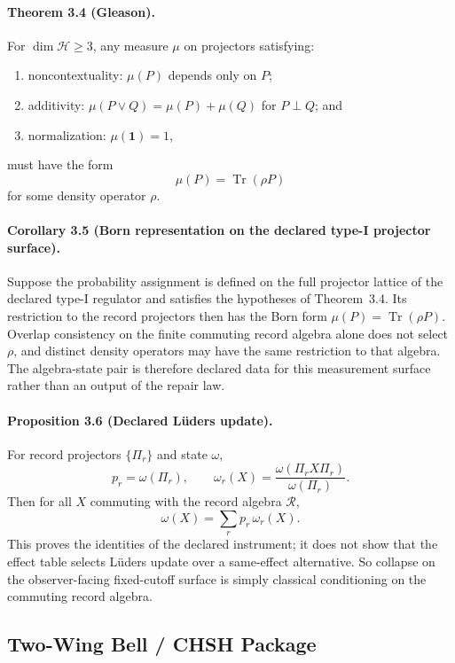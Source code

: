 \paragraph{\textbf{Theorem 3.4 (Gleason).}}
For \(\dim \mathcal H\ge 3\), any measure \(\mu\) on projectors satisfying:
\begin{enumerate}[leftmargin=2em]
\item noncontextuality: \(\mu(P)\) depends only on \(P\);
\item additivity: \(\mu(P\vee Q)=\mu(P)+\mu(Q)\) for \(P\perp Q\); and
\item normalization: \(\mu(\mathbf 1)=1\),
\end{enumerate}
must have the form
\[
\mu(P)=\operatorname{Tr}(\rho P)
\]
for some density operator \(\rho\).

\paragraph{\textbf{Corollary 3.5 (Born representation on the declared type-I projector surface).}}
Suppose the probability assignment is defined on the full projector lattice of the declared
type-I regulator and satisfies the hypotheses of Theorem~3.4. Its restriction to the record
projectors then has the Born form \(\mu(P)=\operatorname{Tr}(\rho P)\). Overlap consistency on the
finite commuting record algebra alone does not select \(\rho\), and distinct density operators may
have the same restriction to that algebra. The algebra-state pair is therefore declared data for
this measurement surface rather than an output of the repair law.

\paragraph{\textbf{Proposition 3.6 (Declared L\"uders update).}}
For record projectors \(\{\Pi_r\}\) and state \(\omega\),
\[
p_r=\omega(\Pi_r),
\qquad
\omega_r(X)=\frac{\omega(\Pi_r X \Pi_r)}{\omega(\Pi_r)}.
\]
Then for all \(X\) commuting with the record algebra \(\mathcal R\),
\[
\omega(X)=\sum_r p_r\,\omega_r(X).
\]
This proves the identities of the declared instrument; it does not show that
the effect table selects L\"uders update over a same-effect alternative.
So collapse on the observer-facing fixed-cutoff surface is simply classical conditioning on the
commuting record algebra.

\subsection{Two-Wing Bell / CHSH Package}


